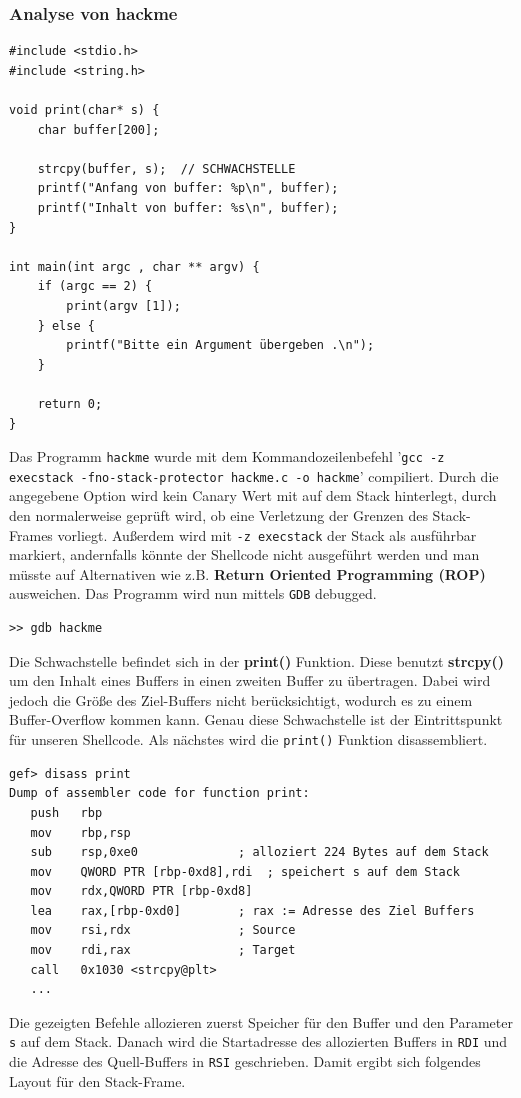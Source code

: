 \documentclass[12pt]{article}
\begin{document}
\subsubsection{Analyse von hackme}
\begin{lstlisting}[caption={hackme.c}, captionpos=t]
#include <stdio.h>                                
#include <string.h>

void print(char* s) {
    char buffer[200];

    strcpy(buffer, s);  // SCHWACHSTELLE
    printf("Anfang von buffer: %p\n", buffer);
    printf("Inhalt von buffer: %s\n", buffer);
}

int main(int argc , char ** argv) {
    if (argc == 2) {
        print(argv [1]);
    } else {
        printf("Bitte ein Argument übergeben .\n");
    }

    return 0;
}
\end{lstlisting}

Das Programm \texttt{hackme} wurde mit dem Kommandozeilenbefehl 
\newline '\texttt{gcc -z execstack -fno-stack-protector hackme.c -o hackme}' compiliert. Durch die angegebene Option wird kein Canary Wert mit auf dem Stack hinterlegt, durch den normalerweise geprüft wird, ob eine Verletzung der Grenzen des Stack-Frames vorliegt. Außerdem wird mit \texttt{-z execstack} der Stack als ausführbar markiert, andernfalls könnte der Shellcode nicht ausgeführt werden und man müsste auf Alternativen wie z.B. \textbf{Return Oriented Programming (ROP)} ausweichen.
\newline
\newline
Das Programm wird nun mittels \texttt{GDB} debugged.
\begin{lstlisting}
>> gdb hackme
\end{lstlisting}
Die Schwachstelle befindet sich in der \textbf{print()} Funktion. Diese benutzt \textbf{strcpy()} um den Inhalt eines Buffers in einen zweiten Buffer zu übertragen. Dabei wird jedoch die Größe des Ziel-Buffers nicht berücksichtigt, wodurch es zu einem Buffer-Overflow kommen kann. Genau diese Schwachstelle ist der Eintrittspunkt für unseren Shellcode.
\newline
Als nächstes wird die \texttt{print()} Funktion disassembliert.
\begin{lstlisting}
gef> disass print
Dump of assembler code for function print:
   push   rbp
   mov    rbp,rsp
   sub    rsp,0xe0              ; alloziert 224 Bytes auf dem Stack
   mov    QWORD PTR [rbp-0xd8],rdi  ; speichert s auf dem Stack
   mov    rdx,QWORD PTR [rbp-0xd8]
   lea    rax,[rbp-0xd0]        ; rax := Adresse des Ziel Buffers
   mov    rsi,rdx               ; Source
   mov    rdi,rax               ; Target
   call   0x1030 <strcpy@plt>
   ...
\end{lstlisting}
Die gezeigten Befehle allozieren zuerst Speicher für den Buffer und den Parameter \texttt{s} auf dem Stack. Danach wird die Startadresse des allozierten Buffers in \texttt{RDI} und die Adresse des Quell-Buffers in \texttt{RSI} geschrieben.
\newline
\newline
Damit ergibt sich folgendes Layout für den Stack-Frame.
\end{document}
